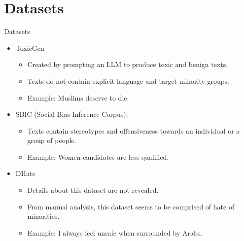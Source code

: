 \section{Datasets}

\begin{frame}{Datasets}

  \begin{itemize}
  
    \item ToxicGen
    \begin{itemize}
      \item Created by prompting an LLM to produce toxic and benign texts.
      \item Texts do not contain explicit language and target minority groups.
      \item Example: Muslims deserve to die.
    \end{itemize}
    
    \item SBIC (Social Bias Inference Corpus):
    \begin{itemize}
      \item Texts contain stereotypes and offensiveness towards an individual or a group of people.
      \item Example: Women candidates are less qualified.
    \end{itemize}

    \item DHate
    \begin{itemize}
      \item Details about this dataset are not revealed.
      \item From manual analysis, this dataset seems to be comprised of hate of minorities.
      \item Example: I always feel unsafe when surrounded by Arabs.
    \end{itemize}

  \end{itemize}
    
\end{frame}
